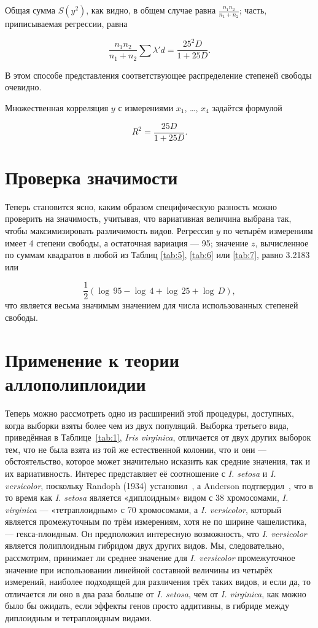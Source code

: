 \documentclass[12pt]{article}
\begin{document}
Общая сумма $S (y^2)$, как видно, в общем случае равна \(\frac{n_{1}n_{2}}{n_{1}+n_{2}}\); часть, приписываемая регрессии, равна

\[
\frac{n_{1}n_{2}}{n_{1}+n_{2}}\sum\lambda' d=\frac{25^{2}D}{1+25D}.
\]

В этом способе представления соответствующее распределение степеней свободы очевидно.

Множественная корреляция $y$ с измерениями $x_{1}$, \ldots, $x_{4}$ задаётся формулой

\[
R^{2}=\frac{25D}{1+25D}.
\]

\section{Проверка значимости}

Теперь становится ясно, каким образом специфическую разность можно проверить на значимость, учитывая, что вариативная величина выбрана так, чтобы максимизировать различимость видов. Регрессия $y$ по четырём измерениям имеет 4 степени свободы, а остаточная вариация — 95; значение $z$, вычисленное по суммам квадратов в любой из Таблиц \ref{tab:5}, \ref{tab:6} или \ref{tab:7}, равно 3.2183 или

\[
\frac{1}{2} (\log\,95-\log\,4+\log\,25+\log\,D),
\]
что является весьма значимым значением для числа использованных степеней свободы.

\section{Применение к теории аллополиплоидии}

Теперь можно рассмотреть одно из расширений этой процедуры, доступных, когда выборки взяты более чем из двух популяций. Выборка третьего вида, приведённая в Таблице~\ref{tab:1}, \textit{Iris virginica}, отличается от двух других выборок тем, что не была взята из той же естественной колонии, что и они — обстоятельство, которое может значительно исказить как средние значения, так и их вариативность.  
Интерес представляет её соотношение с \textit{I. setosa} и \textit{I. versicolor}, поскольку Randoph (1934) установил~\cite{randolph1934}, а Anderson подтвердил~\cite{anderson1935}, что в то время как \textit{I. setosa} является «диплоидным» видом с 38 хромосомами, \textit{I. virginica} — «тетраплоидным» с 70 хромосомами, а \textit{I. versicolor}, который является промежуточным по трём измерениям, хотя не по ширине чашелистика, — гекса-плоидным. Он предположил интересную возможность, что \textit{I. versicolor} является полиплоидным гибридом двух других видов.  
Мы, следовательно, рассмотрим, принимает ли среднее значение для \textit{I. versicolor} промежуточное значение при использовании линейной составной величины из четырёх измерений, наиболее подходящей для различения трёх таких видов, и если да, то отличается ли оно в два раза больше от \textit{I. setosa}, чем от \textit{I. virginica}, как можно было бы ожидать, если эффекты генов просто аддитивны, в гибриде между диплоидным и тетраплоидным видами.
\end{document}
